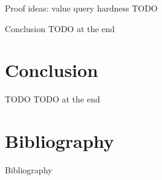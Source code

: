 \documentclass{beamer}
\theoremstyle{definition}
\theoremstyle{remark}
\begin{document}
\begin{frame}{Proof ideas: value query hardness}
  TODO
\end{frame}

\begin{frame}{Conclusion}
  TODO at the end
\end{frame}

\section{Conclusion}
\begin{frame}{TODO}
  TODO at the end
\end{frame}

\appendix
\section{Bibliography}
\begin{frame}[allowframebreaks]{Bibliography}
  
  
\end{frame}

\end{document}
